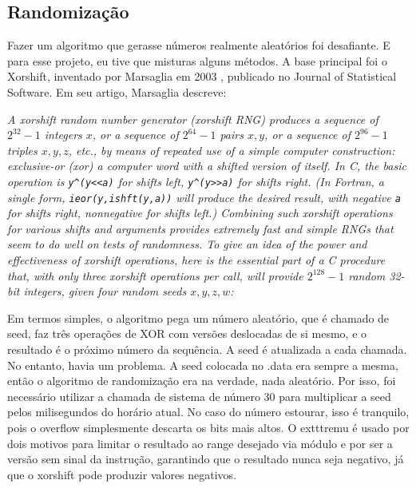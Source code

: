 \documentclass[AMA,twocolumn]{USG}
\begin{document}
\subsection{Randomização}
Fazer um algoritmo que gerasse números realmente aleatórios foi desafiante. E para esse projeto, eu tive que
misturas alguns métodos. A base principal foi o Xorshift, inventado por Marsaglia em 2003 \cite{marsaglia2003xorshift}, publicado no
Journal of Statistical Software. 
Em seu artigo, Marsaglia descreve:
\begin{tcolorbox}[colback=gray!8, colframe=gray!40, boxrule=0.4pt, arc=2pt, left=4pt, right=4pt, top=4pt, bottom=4pt]
\normalsize\itshape
A xorshift random number generator (xorshift RNG) produces a sequence of $2^{32}-1$ integers $x$, or a sequence of $2^{64}-1$ pairs $x,y$, or a sequence of $2^{96}-1$ triples $x,y,z$, etc., by means of repeated use of a simple computer construction: exclusive-or (xor) a computer word with a shifted version of itself. In C, the basic operation is \texttt{y\^{}(y<<a)} for shifts left, \texttt{y\^{}(y>>a)} for shifts right. (In Fortran, a single form, \texttt{ieor(y,ishft(y,a))} will produce the desired result, with negative \texttt{a} for shifts right, nonnegative for shifts left.) Combining such xorshift operations for various shifts and arguments provides extremely fast and simple RNGs that seem to do well on tests of randomness. To give an idea of the power and effectiveness of xorshift operations, here is the essential part of a C procedure that, with only three xorshift operations per call, will provide $2^{128}-1$ random 32-bit integers, given four random seeds $x,y,z,w$: \cite{marsaglia2003xorshift}
\end{tcolorbox}

Em termos simples, o algoritmo pega um número aleatório, que é chamado de seed,
faz três operações de XOR com versões deslocadas de si mesmo, e 
o resultado é o próximo número da sequência. A seed é atualizada 
a cada chamada. No entanto, havia um problema. A seed colocada no .data era sempre a mesma, então o algoritmo
de randomização era na verdade, nada aleatório. Por isso, foi necessário utilizar a chamada de sistema de 
número 30 para multiplicar a seed pelos milisegundos do horário atual. No caso do número estourar, isso
é tranquilo, pois o overflow simplesmente descarta os bits mais altos. O 	
exttt{remu} é usado por dois motivos para limitar o resultado ao range desejado via módulo
e por ser a versão sem sinal da instrução, garantindo que o resultado nunca seja negativo,
já que o xorshift pode produzir valores negativos.
\end{document}
